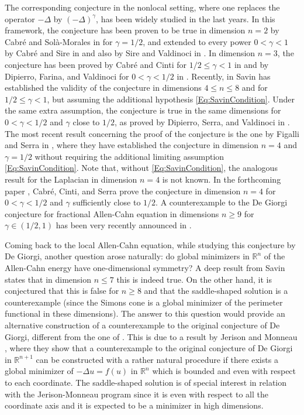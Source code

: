 \documentclass[12pt,reqno]{amsart}
\theoremstyle{definition}
\theoremstyle{remark}
\newcommand{\con}[1]{\mathbb{#1}}
\newcommand{\R}{\con{R}} %
\newcommand{\s}{\gamma}
\newcommand{\fraclaplacian}{(-\Delta)^\s}
\numberwithin{equation}{section}
\begin{document}
The corresponding conjecture in the nonlocal setting, where one replaces the operator $-\Delta$ by $\fraclaplacian$, has been widely studied in the last years. In this framework, the conjecture has been proven to be true in dimension $n=2$ by Cabré and Solà-Morales in \cite{CabreSolaMorales} for $\s=1/2$, and extended to every power $0<\s<1$ by Cabré and Sire in \cite{CabreSireII} and also by Sire and Valdinoci in \cite{SireValdinoci}. In dimension $n=3$, the conjecture has been proved by Cabré and Cinti for $1/2 \leq \s < 1$ in \cite{CabreCinti-EnergyHalfL, CabreCinti-SharpEnergy} and by Dipierro, Farina, and Valdinoci for $0<\s<1/2$ in \cite{DipierroFarinaValdinoci}. Recently, in \cite{Savin-Fractional,Savin-Fractional2} Savin has established the validity of the conjecture in dimensions $4\leq n \leq 8$ and for $1/2 \leq \s < 1$, but assuming the additional hypothesis \eqref{Eq:SavinCondition}. Under the same extra assumption, the conjecture is true in the same dimensions for $0<\s<1/2$ and $\s$ close to $1/2$, as proved by Dipierro, Serra, and Valdinoci in \cite{DipierroSerraValdinoci}. The most recent result concerning the proof of the conjecture is the one by Figalli and Serra in \cite{FigalliSerra}, where they have established the conjecture in dimension $n=4$ and $\s=1/2$ without requiring the additional limiting assumption \eqref{Eq:SavinCondition}. Note that, without \eqref{Eq:SavinCondition}, the analogous result for the Laplacian in dimension $n=4$ is not known. In the forthcoming paper \cite{CabreCintiSerra-Stable}, Cabré, Cinti, and Serra prove the conjecture in dimension $n=4$ for $0<\s<1/2$ and $\s$ sufficiently close to $1/2$. A counterexample to the De Giorgi conjecture for fractional Allen-Cahn equation in dimensions $n \geq 9$ for $\s \in ( 1/2 , 1)$ has been very recently announced in \cite{ChanLiuWei}.

Coming back to the local Allen-Cahn equation, while studying this conjecture by De Giorgi, another question arose naturally: do global minimizers in $\R^n$ of the Allen-Cahn energy have one-dimensional symmetry? A deep result from Savin \cite{Savin-DeGiorgi} states that in dimension $n \leq 7$ this is indeed true. On the other hand, it is conjectured that this is false for $n\geq 8$ and that the saddle-shaped solution is a counterexample (since the Simons cone is a global minimizer of the perimeter functional in these dimensions). The answer to this question would provide an alternative construction of a counterexample to the original conjecture of De Giorgi, different from the one of \cite{delPinoKowalczykWei}. This is due to a result by Jerison and Monneau \cite{JerisonMonneau}, where they show that a counterexample to the original conjecture of De Giorgi in $\R^{n+1}$ can be constructed with a rather natural procedure if there exists a global minimizer of $-\Delta u = f(u)$ in $\R^n$ which is bounded and even with respect to each coordinate. The saddle-shaped solution is of special interest in relation with the Jerison-Monneau program since it is even with respect to all the coordinate axis and it is expected to be a minimizer in high dimensions.
\end{document}
